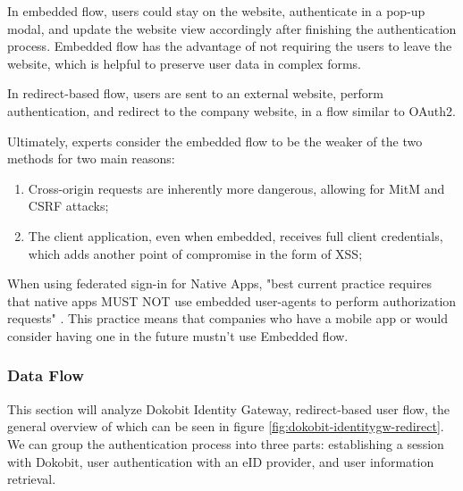 In embedded flow, users could stay on the website, authenticate in a pop-up modal, and update the website view accordingly after finishing the authentication process. Embedded flow has the advantage of not requiring the users to leave the website, which is helpful to preserve user data in complex forms.

In redirect-based flow, users are sent to an external website, perform authentication, and redirect to the company website, in a flow similar to OAuth2.

Ultimately, experts consider the embedded flow to be the weaker of the two methods \cite{auth0-universal-vs-embedded} for two main reasons:

\begin{enumerate}
  \item Cross-origin requests are inherently more dangerous, allowing for MitM and CSRF attacks;
  \item The client application, even when embedded, receives full client credentials, which adds another point of compromise in the form of XSS;
\end{enumerate}

When using federated sign-in for Native Apps, "best current practice requires that native apps MUST NOT use embedded user-agents to perform authorization requests" \cite{rfc8252}. This practice means that companies who have a mobile app or would consider having one in the future mustn't use Embedded flow.

\subsubsection{Data Flow}

This section will analyze Dokobit Identity Gateway, redirect-based user flow, the general overview of which can be seen in figure \ref{fig:dokobit-identitygw-redirect}. We can group the authentication process into three parts: establishing a session with Dokobit, user authentication with an eID provider, and user information retrieval.

